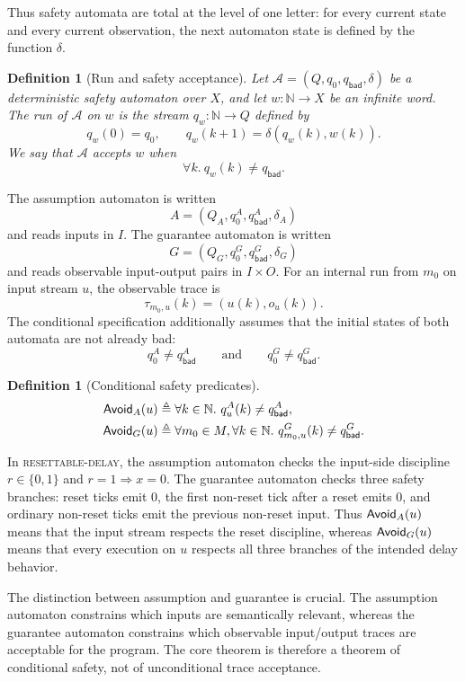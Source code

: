 \documentclass[acmsmall,screen]{acmart}
\theoremstyle{leftplain}
\theoremstyle{leftdefinition}
\newtheorem{definition}[theorem]{Definition}
\theoremstyle{leftremark}
\begin{document}
Thus safety automata are total at the level of one letter: for every current
state and every current observation, the next automaton state is defined by
the function $\delta$.

\begin{definition}[Run and safety acceptance]
Let $\mathcal{A}=(Q,q_0,q_{\mathsf{bad}},\delta)$ be a deterministic safety
automaton over $X$, and let $w : \mathbb{N} \to X$ be an infinite word. The
run of $\mathcal{A}$ on $w$ is the stream $q_w : \mathbb{N} \to Q$ defined by
\[
  q_w(0)=q_0,\qquad q_w(k+1)=\delta(q_w(k),w(k)).
\]
We say that $\mathcal{A}$ accepts $w$ when
\[
  \forall k.\ q_w(k) \neq q_{\mathsf{bad}}.
\]
\end{definition}

The assumption automaton is written
\[
  A=(Q_A,q^A_0,q^A_{\mathsf{bad}},\delta_A)
\]
and reads inputs in $I$. The guarantee automaton is written
\[
  G=(Q_G,q^G_0,q^G_{\mathsf{bad}},\delta_G)
\]
and reads observable input-output pairs in $I \times O$. For an internal run
from $m_0$ on input stream $u$, the observable trace is
\[
  \tau_{m_0,u}(k) = (u(k), o_u(k)).
\]
The conditional specification additionally assumes that the initial states of
both automata are not already bad:
\[
  q^A_0 \neq q^A_{\mathsf{bad}}
  \qquad\text{and}\qquad
  q^G_0 \neq q^G_{\mathsf{bad}}.
\]

\begin{definition}[Conditional safety predicates]
\begin{align*}
  \mathsf{Avoid}_A(u) &\triangleq
    \forall k \in \mathbb{N}.\ q^A_u(k) \neq q^A_{\mathsf{bad}},\\
  \mathsf{Avoid}_G(u) &\triangleq
    \forall m_0 \in M,\forall k \in \mathbb{N}.\ q^G_{m_0,u}(k) \neq q^G_{\mathsf{bad}}.
\end{align*}
\end{definition}

\noindent{}
In \textsc{resettable-delay}, the assumption automaton checks the input-side
discipline $r \in \{0,1\}$ and $r=1 \Rightarrow x=0$. The guarantee automaton
checks three safety branches: reset ticks emit $0$, the first non-reset tick
after a reset emits $0$, and ordinary non-reset ticks emit the previous
non-reset input. Thus $\mathsf{Avoid}_A(u)$ means that the input stream respects the
reset discipline, whereas $\mathsf{Avoid}_G(u)$ means that every execution on $u$
respects all three branches of the intended delay behavior.

The distinction between assumption and guarantee is crucial. The assumption
automaton constrains which inputs are semantically relevant, whereas the
guarantee automaton constrains which observable input/output traces are
acceptable for the program. The core theorem is therefore a theorem of
conditional safety, not of unconditional trace acceptance.
\end{document}
